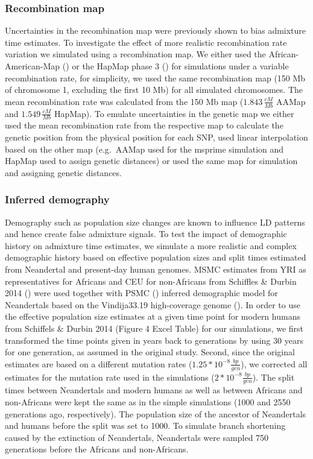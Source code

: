 \documentclass[]{article}
\begin{document}
\subsubsection{Recombination map}\label{recombination map}

Uncertainties in the recombination map were previously shown to bias
admixture time estimates. To investigate the effect of more realistic
recombination rate variation we simulated using a recombination map. We
either used the African-American-Map (\cite{hinch_landscape_2011}) or
the HapMap phase 3 (\cite{HapMapConsortium_second_2007}) for simulations
under a variable recombination rate, for simplicity, we used the same
recombination map (150 Mb of chromosome 1, excluding the first 10 Mb)
for all simulated chromosomes. The mean recombination rate was
calculated from the 150 Mb map (\(1.843 \, \frac{cM}{Mb}\) AAMap and
\(1.549 \, \frac{cM}{Mb}\) HapMap). To emulate uncertainties in the
genetic map we either used the mean recombination rate from the
respective map to calculate the genetic position from the physical
position for each SNP, used linear interpolation based on the other map
(e.g.~AAMap used for the msprime simulation and HapMap used to assign
genetic distances) or used the same map for simulation and assigning
genetic distances.

\subsubsection{Inferred demography}\label{inferred demography}

Demography such as population size changes are known to influence LD
patterns and hence create false admixture signals. To test the impact of
demographic history on admixture time estimates, we simulate a more
realistic and complex demographic history based on effective population
sizes and split times estimated from Neandertal and present-day human
genomes. MSMC estimates from YRI as representatives for Africans and CEU
for non-Africans from Schiffles \& Durbin 2014
(\cite{schiffels_inferring_2014}) were used together with PSMC
(\cite{li_inference_2011}) inferred demographic model for Neandertals
based on the Vindija33.19 high-coverage genome
(\cite{prufer_high-coverage_2017}). In order to use the effective
population size estimates at a given time point for modern humans from
Schiffels \& Durbin 2014 (Figure 4 Excel Table) for our simulations, we
first transformed the time points given in years back to generations by
using 30 years for one generation, as assumed in the original study.
Second, since the original estimates are based on a different mutation
rates (\(1.25*10^{-8} \frac{bp}{gen}\)), we corrected all estimates for
the mutation rate used in the simulations
(\(2*10^{-8} \frac{bp}{gen}\)). The split times between Neandertals and
modern humans as well as between Africans and non-Africans were kept the
same as in the simple simulations (1000 and 2550 generations ago,
respectively). The population size of the ancestor of Neandertals and
humans before the split was set to 1000. To simulate branch shortening
caused by the extinction of Neandertals, Neandertals were sampled 750
generations before the Africans and non-Africans.
\end{document}
